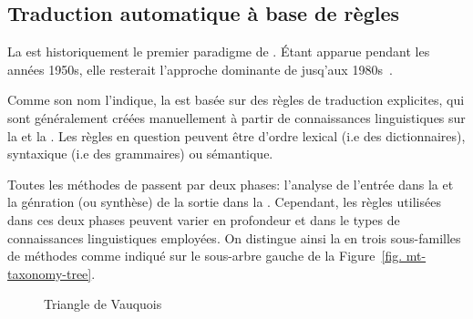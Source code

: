 \subsection{Traduction automatique à base de règles}
\label{sec. rbmt}

La  est historiquement le premier paradigme de . 
Étant apparue pendant les années 1950s, 
elle resterait l'approche dominante de  jusq'aux 1980s~\cite{routledge}.

Comme son nom l'indique, la  est basée sur des règles de traduction explicites,
qui sont généralement créées manuellement à partir de connaissances linguistiques sur la  et la . 
Les règles en question peuvent être d'ordre lexical (i.e des dictionnaires),
syntaxique (i.e des grammaires) ou sémantique.

Toutes les méthodes de  passent par deux phases: 
l'analyse de l'entrée dans la  
et la génration (ou synthèse) de la sortie dans la . 
Cependant, les règles utilisées dans ces deux phases peuvent varier en profondeur
et dans le types de connaissances linguistiques employées. 
On distingue ainsi la  en trois sous-familles de méthodes comme indiqué 
sur le sous-arbre gauche de la Figure~\ref{fig. mt-taxonomy-tree}.

\begin{figure}[h]
    \begin{center}
        
    \end{center}
    \caption{Triangle de Vauquois}
    \label{fig. vauquois-triangle}
\end{figure}


